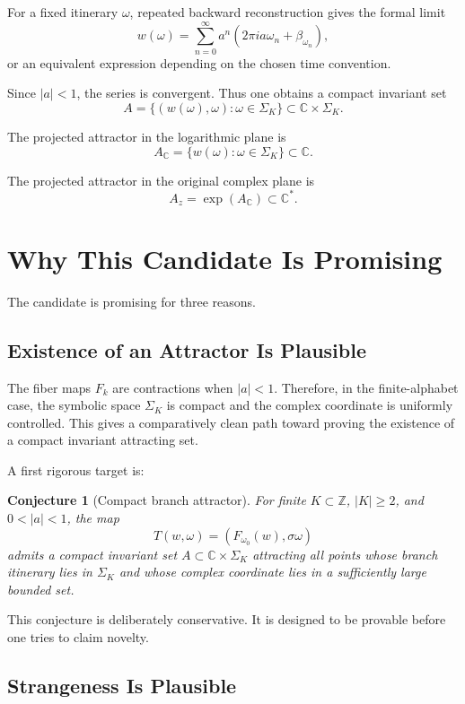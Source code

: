 \documentclass[12pt]{article}
\newtheorem{conjecture}{Conjecture}
\newcommand{\C}{\mathbb{C}}
\newcommand{\Z}{\mathbb{Z}}
\newcommand{\shift}{\sigma}
\begin{document}
	For a fixed itinerary \(\omega\), repeated backward reconstruction gives the formal limit
	\[
	w(\omega)
	=
	\sum_{n=0}^{\infty}
	a^n
	\left(
	2\pi i a \omega_n+\beta_{\omega_n}
	\right),
	\]
	or an equivalent expression depending on the chosen time convention.
	
	Since \(|a|<1\), the series is convergent. Thus one obtains a compact invariant set
	\[
	A
	=
	\{
	(w(\omega),\omega)
	:
	\omega\in\Sigma_K
	\}
	\subset \C\times \Sigma_K.
	\]
	
	The projected attractor in the logarithmic plane is
	\[
	A_{\C}
	=
	\{
	w(\omega)
	:
	\omega\in\Sigma_K
	\}
	\subset \C.
	\]
	
	The projected attractor in the original complex plane is
	\[
	A_z
	=
	\exp(A_{\C})
	\subset \C^\ast.
	\]
	
	\section{Why This Candidate Is Promising}
	
	The candidate is promising for three reasons.
	
	\subsection{Existence of an Attractor Is Plausible}
	
	The fiber maps \(F_k\) are contractions when \(|a|<1\). Therefore, in the finite-alphabet case, the symbolic space \(\Sigma_K\) is compact and the complex coordinate is uniformly controlled. This gives a comparatively clean path toward proving the existence of a compact invariant attracting set.
	
	A first rigorous target is:
	
	\begin{conjecture}[Compact branch attractor]
		For finite \(K\subset\Z\), \(|K|\geq 2\), and \(0<|a|<1\), the map
		\[
		T(w,\omega)
		=
		(F_{\omega_0}(w),\shift\omega)
		\]
		admits a compact invariant set \(A\subset \C\times\Sigma_K\) attracting all points whose branch itinerary lies in \(\Sigma_K\) and whose complex coordinate lies in a sufficiently large bounded set.
	\end{conjecture}
	
	This conjecture is deliberately conservative. It is designed to be provable before one tries to claim novelty.
	
	\subsection{Strangeness Is Plausible}
	
\end{document}

